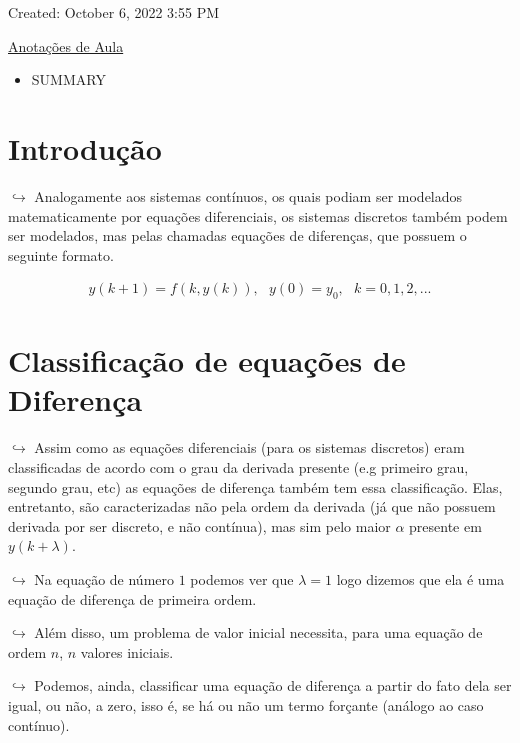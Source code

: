 \documentclass[]{article}
\providecommand{\tightlist}{%
  \setlength{\itemsep}{0pt}\setlength{\parskip}{0pt}}
\begin{document}
  Created: October 6, 2022 3:55 PM

  \href{Equac\%CC\%A7o\%CC\%83es\%20de\%20Diferenc\%CC\%A7as\%20dade9854b424474788d76d451ec8302f/Anotac\%CC\%A7o\%CC\%83es\%20de\%20Aula\%20ce10f190576744fca8e314d3558b930f.md}{Anotações
  de Aula}

  \begin{itemize}
  \tightlist
  \item
    SUMMARY
  \end{itemize}

  \hypertarget{introduuxe7uxe3o-5}{%
  \section{Introdução}\label{introduuxe7uxe3o-5}}

  \(\hookrightarrow\) Analogamente aos sistemas contínuos, os quais podiam
  ser modelados matematicamente por equações diferenciais, os sistemas
  discretos também podem ser modelados, mas pelas chamadas equações de
  diferenças, que possuem o seguinte formato.

  \[
  \begin{align}y(k + 1) = f(k, y(k)), \ \ \ y(0) = y_0,  \ \ \ k = 0, 1, 2, ...
  \end{align}
  \]

  \hypertarget{classificauxe7uxe3o-de-equauxe7uxf5es-de-diferenuxe7a}{%
  \section{Classificação de equações de
  Diferença}\label{classificauxe7uxe3o-de-equauxe7uxf5es-de-diferenuxe7a}}

  \(\hookrightarrow\) Assim como as equações diferenciais (para os
  sistemas discretos) eram classificadas de acordo com o grau da derivada
  presente (e.g primeiro grau, segundo grau, etc) as equações de diferença
  também tem essa classificação. Elas, entretanto, são caracterizadas não
  pela ordem da derivada (já que não possuem derivada por ser discreto, e
  não contínua), mas sim pelo maior \(\alpha\) presente em
  \(y(k+\lambda)\).

  \(\hookrightarrow\) Na equação de número \(1\) podemos ver que
  \(\lambda = 1\) logo dizemos que ela é uma equação de diferença de
  primeira ordem.

  \(\hookrightarrow\) Além disso, um problema de valor inicial necessita,
  para uma equação de ordem \(n\), \(n\) valores iniciais.

  \(\hookrightarrow\) Podemos, ainda, classificar uma equação de diferença
  a partir do fato dela ser igual, ou não, a zero, isso é, se há ou não um
  termo forçante (análogo ao caso contínuo).
\end{document}
